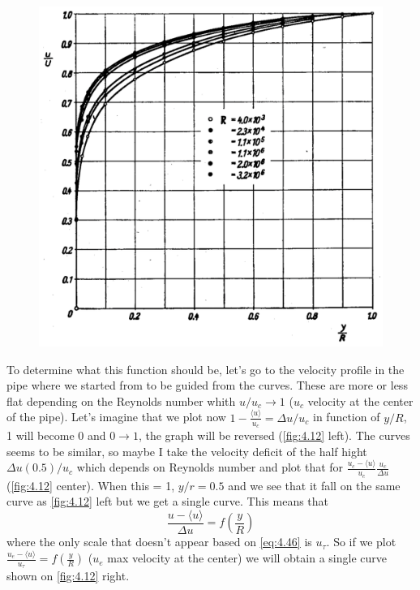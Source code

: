 		\begin{figure}
		\vspace{-5mm}
		\includegraphics[scale=0.20]{ch4/11}
		\end{figure} 
		To determine what this function should be, let's go to the velocity profile in the pipe where we started from to be guided from the curves. These are more or less flat depending on the Reynolds number whith $u/u_c \rightarrow 1$ ($u_c$ velocity at the center of the pipe). Let's imagine that we plot now $1-\frac{\langle u \rangle}{u_c} = \Delta u /u_c$ in function of $y/R$, 1 will become 0 and  $0 \rightarrow 1$, the graph will be reversed (\autoref{fig:4.12} left). The curves seems to be similar, so maybe I take the velocity deficit of the half hight $\Delta u(0.5)/u_c$ which depends on Reynolds number and plot that for $\frac{u_c - \langle u \rangle}{u_c}\frac{u_c}{\Delta u}$ (\autoref{fig:4.12} center). When this = 1, $y/r = 0.5$ and we see that it fall on the same curve as \autoref{fig:4.12} left but we get a single curve. This means that 
		\begin{equation}
			\frac{u - \langle u \rangle}{\Delta u} = f\left(\frac{y}{R}\right)
		\end{equation}
		where the only scale that doesn't appear based on \eqref{eq:4.46} is $u_\tau$. So if we plot $\frac{u_e  - \langle u \rangle}{u_\tau} = f\left(\frac{y}{R}\right)$ ($u_e$ max velocity at the center) we will obtain a single curve shown on \autoref{fig:4.12} right. 
